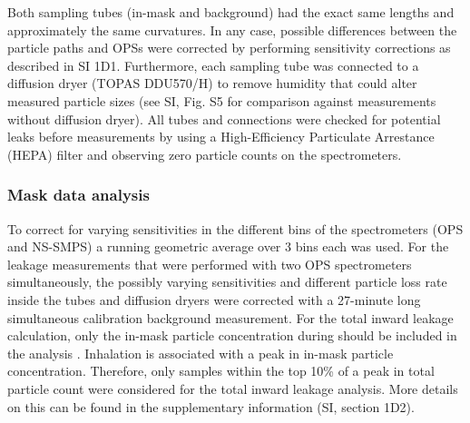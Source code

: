 \documentclass[preprint]{elsarticle}
\begin{document}
Both sampling tubes (in-mask and background) had the exact same lengths and approximately the same curvatures. In any case, possible differences between the particle paths and OPSs were corrected by performing sensitivity corrections as described in SI 1D1. Furthermore, each sampling tube was connected to a diffusion dryer (TOPAS DDU570/H) to remove humidity that could alter measured particle sizes (see SI, Fig. S5 for comparison against measurements without diffusion dryer). All tubes and connections were checked for potential leaks before measurements by using a High-Efficiency Particulate Arrestance (HEPA) filter and observing zero particle counts on the spectrometers. 

\subsubsection{Mask data analysis}
To correct for varying sensitivities in the different bins of the spectrometers (OPS and NS-SMPS) a running geometric average over 3 bins each was used. For the leakage measurements that were performed with two OPS spectrometers simultaneously, the possibly varying sensitivities and different particle loss rate inside the tubes and diffusion dryers were corrected with a 27-minute long simultaneous calibration background measurement.
For the total inward leakage calculation, only the in-mask particle concentration during should be included in the analysis \cite{myers1986parameters}. Inhalation is associated with a peak in in-mask particle concentration. Therefore, only samples within the top 10\% of a peak in total particle count were considered for the total inward leakage analysis. More details on this can be found in the supplementary information (SI, section 1D2).
\end{document}

